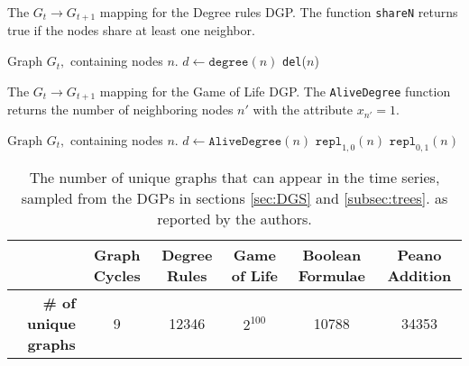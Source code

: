 \begin{minipage}{0.46\textwidth}
\begin{algorithm}[H]
\centering
\caption{The $G_{t} \to G_{t+1}$ mapping for the Degree rules DGP. The function \texttt{shareN} returns true if the nodes share at least one neighbor.}\label{alg:degree}
\begin{algorithmic}[1]
\Require Graph $G_{t},$ containing nodes $n$.
\State $d \gets \texttt{degree}(n)$
 \texttt{del}($n$)
\EndMyFor
{}
\EndIf
\EndMyFor
\EndMyFor
\end{algorithmic}
\end{algorithm}
\end{minipage}
\hfill
\begin{minipage}{0.46\textwidth}
\begin{algorithm}[H]
    \centering
    \caption{The $G_{t} \to G_{t+1}$ mapping for the Game of Life DGP. The \texttt{AliveDegree} function returns the number of neighboring nodes $n'$ with the attribute $x_{n'}=1$. }\label{alg:gol}
   \begin{algorithmic}[1]
\Require $\text{Graph } G_{t}, $ containing nodes $n$.
    \State $d \gets \texttt{AliveDegree}(n)$
        \State $\texttt{repl}_{1,0}(n)$
        \State $\texttt{repl}_{0,1}(n)$
\EndIf
\EndMyFor
\end{algorithmic}
\end{algorithm}
\end{minipage}

\begin{table}[h]

\begin{tabular}{@{}rccccc@{}}
\toprule
\textbf{}                    & \textbf{Graph Cycles} & \textbf{Degree Rules} & \textbf{Game of Life}  & \textbf{Boolean Formulae} & \textbf{Peano Addition} \\ \midrule
\textbf{\# of unique graphs} & 9                     & 12346                 & $2^{100}$ & 10788                     & 34353                   \\ \bottomrule
\end{tabular}
\vspace{1mm}
\caption{The number of unique graphs that can appear in the time series, sampled from the DGPs in sections \ref{sec:DGS} and \ref{subsec:trees}. as reported by the authors.}
\label{tab:numunique}

\end{table}

